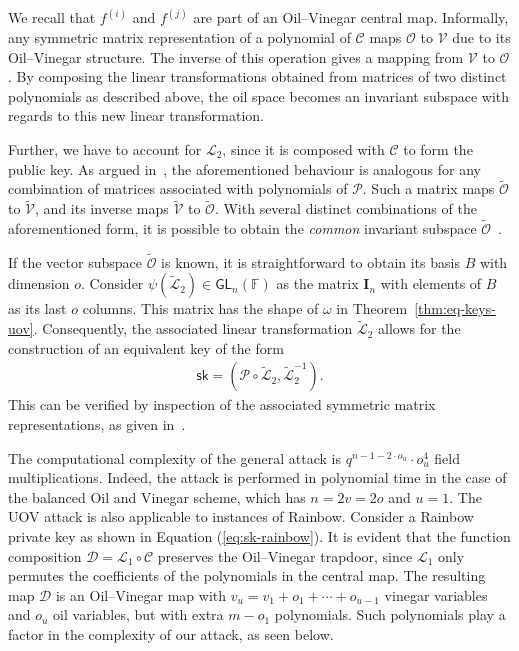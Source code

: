 \documentclass[12pt, a4paper, oneside]{memoir}
\theoremstyle{definition}
\begin{document}
We recall that $f^{(i)}$ and $f^{(j)}$ are part of an Oil--Vinegar central map. Informally, any symmetric matrix representation of a polynomial of $\mathcal{C}$ maps $\mathcal{O}$ to $\mathcal{V}$ due to its Oil--Vinegar structure. The inverse of this operation gives a mapping from $\mathcal{V}$ to $\mathcal{O}$. By composing the linear transformations obtained from matrices of two distinct polynomials as described above, the oil space becomes an invariant subspace with regards to this new linear transformation.

Further, we have to account for $\mathcal{L}_{2}$, since it is composed with $\mathcal{C}$ to form the public key. As argued in~\cite[p.~261]{Kipnis:199808}, the aforementioned behaviour is analogous for any combination of matrices associated with polynomials of $\mathcal{P}$. Such a matrix maps $\widetilde{\mathcal{O}}$ to $\widetilde{\mathcal{V}}$, and its inverse maps $\widetilde{\mathcal{V}}$ to $\widetilde{\mathcal{O}}$. With several distinct combinations of the aforementioned form, it is possible to obtain the \emph{common} invariant subspace $\widetilde{\mathcal{O}}$~\cite[Thm.~1]{Kipnis:199904}.

If the vector subspace $\widetilde{\mathcal{O}}$ is known, it is straightforward to obtain its basis $B$ with dimension $o$. Consider $\psi(\widetilde{\mathcal{L}}_{2}) \in \textsf{GL}_{n}(\mathbb{F})$ as the matrix $\mathbf{I}_{n}$ with elements of $B$ as its last $o$ columns. This matrix has the shape of $\omega$ in Theorem~\ref{thm:eq-keys-uov}. Consequently, the associated linear transformation $\widetilde{\mathcal{L}}_{2}$ allows for the construction of an equivalent key of the form
\begin{align}\label{eq:uov-attack-eq}
  \textsf{sk} = (\mathcal{P} \circ \widetilde{\mathcal{L}}_{2}, \widetilde{\mathcal{L}}_{2}^{-1}).
\end{align}
This can be verified by inspection of the associated symmetric matrix representations, as given in~\cite[p.~71]{Ding:2006}.

The computational complexity of the general attack is $q^{n - 1 - 2 \cdot o_{u}} \cdot o_{u}^{4}$ field multiplications. Indeed, the attack is performed in polynomial time in the case of the balanced Oil and Vinegar scheme, which has $n = 2v = 2o$ and $u = 1$. The UOV attack is also applicable to instances of Rainbow. Consider a Rainbow private key as shown in Equation (\ref{eq:sk-rainbow}). It is evident that the function composition $\mathcal{D} = \mathcal{L}_{1} \circ \mathcal{C}$ preserves the Oil--Vinegar trapdoor, since $\mathcal{L}_{1}$ only permutes the coefficients of the polynomials in the central map. The resulting map $\mathcal{D}$ is an Oil--Vinegar map with $v_{u} = v_{1} + o_{1} + \cdots + o_{u - 1}$ vinegar variables and $o_{u}$ oil variables, but with extra $m - o_{1}$ polynomials. Such polynomials play a factor in the complexity of our attack, as seen below.
\end{document}
